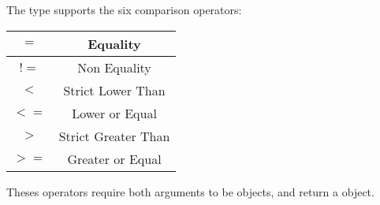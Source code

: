 The  type supports the six comparison operators:\newline

\begin{tabular}{|c|c|}
\hline
$=$ & Equality \\
\hline
$!=$ & Non Equality \\
\hline
$<$  & Strict Lower Than \\
\hline
$<=$  & Lower or Equal \\
\hline
$>$  & Strict Greater Than \\
\hline
$>=$  & Greater or Equal \\
\hline
\end{tabular}

Theses operators require both arguments to be  objects, and return a  object.


